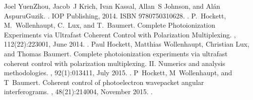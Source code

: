 \documentclass[letterpaper,table,10pt,english]{jupyterBook}
\begin{document}
\begin{sphinxthebibliography}{10}
\sphinxAtStartPar
Joel Yuen\sphinxhyphen{}Zhou, Jacob J Krich, Ivan Kassal, Allan S Johnson, and Alán Aspuru\sphinxhyphen{}Guzik. . IOP Publishing, 2014. ISBN 978\sphinxhyphen{}0\sphinxhyphen{}7503\sphinxhyphen{}1062\sphinxhyphen{}8. .
\sphinxAtStartPar
P. Hockett, M. Wollenhaupt, C. Lux, and T. Baumert. Complete Photoionization Experiments via Ultrafast Coherent Control with Polarization Multiplexing. , 112(22):223001, June 2014. .
\sphinxAtStartPar
Paul Hockett, Matthias Wollenhaupt, Christian Lux, and Thomas Baumert. Complete photoionization experiments via ultrafast coherent control with polarization multiplexing. II. Numerics and analysis methodologies. , 92(1):013411, July 2015. .
\sphinxAtStartPar
P Hockett, M Wollenhaupt, and T Baumert. Coherent control of photoelectron wavepacket angular interferograms. , 48(21):214004, November 2015. .
\end{sphinxthebibliography}







\renewcommand{\indexname}{Index}
\printindex
\end{document}
